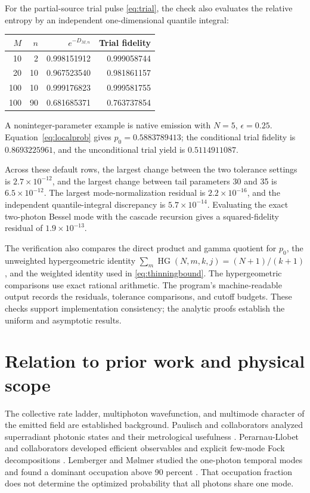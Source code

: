 \documentclass[11pt,a4paper]{article}
\newcommand{\HG}{\operatorname{HG}}
\begin{document}
For the partial-source trial pulse \eqref{eq:trial}, the check
also evaluates the relative entropy by an independent
one-dimensional quantile integral:
\begin{center}
\begin{tabular}{@{}rrrr@{}}
\toprule
\(M\)&\(n\)&\(e^{-D_{M,n}}\)&Trial fidelity\\
\midrule
10&2&0.998151912&0.999058744\\
20&10&0.967523540&0.981861157\\
100&10&0.999176823&0.999581755\\
100&90&0.681685371&0.763737854\\
\bottomrule
\end{tabular}
\end{center}
A noninteger-parameter example is native emission with
\(N=5\), \(\epsilon=0.25\). Equation~\eqref{eq:localprob} gives
\(p_0=0.5883789413\); the conditional trial fidelity is
\(0.8693225961\), and the unconditional trial yield is
\(0.5114911087\).

Across these default rows, the largest change between the two
tolerance settings is \(2.7\times10^{-12}\), and the largest
change between tail parameters 30 and 35 is
\(6.5\times10^{-12}\). The largest mode-normalization residual is
\(2.2\times10^{-16}\), and the independent quantile-integral
discrepancy is \(5.7\times10^{-14}\). Evaluating the exact
two-photon Bessel mode with the cascade recursion gives a
squared-fidelity residual of \(1.9\times10^{-13}\).

The verification also compares the direct product and gamma
quotient for \(p_0\), the unweighted hypergeometric identity
\(\sum_m\HG(N,m,k,j)=(N+1)/(k+1)\), and the weighted identity
used in \eqref{eq:thinningbound}. The hypergeometric comparisons
use exact rational arithmetic. The program's machine-readable
output records the residuals, tolerance comparisons, and cutoff
budgets. These checks support implementation consistency; the
analytic proofs establish the uniform and asymptotic results.

\section{Relation to prior work and physical scope}
\label{sec:discussion}

The collective rate ladder, multiphoton wavefunction, and
multimode character of the emitted field are established
background. Paulisch and collaborators analyzed superradiant
photonic states and their metrological usefulness
\cite{paulisch}. Perarnau-Llobet and collaborators developed
efficient observables and explicit few-mode Fock decompositions
\cite{perarnau}. Lemberger and M\o lmer studied the one-photon
temporal modes and found a dominant occupation above 90 percent
\cite{lemberger}. That occupation fraction does not determine the
optimized probability that all photons share one mode.
\end{document}
